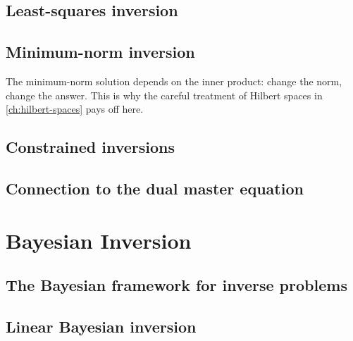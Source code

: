 \documentclass[11pt,twoside,openright]{book}
\theoremstyle{plain}
\theoremstyle{definition}
\theoremstyle{remark}
\begin{document}
\section{Least-squares inversion}
\label{sec:least-squares}

\section{Minimum-norm inversion}
\label{sec:minimum-norm}

\begin{whybox}
The minimum-norm solution depends on the inner product: change the norm,
change the answer. This is why the careful treatment of Hilbert spaces
in \cref{ch:hilbert-spaces} pays off here.
\end{whybox}

\section{Constrained inversions}
\label{sec:constrained-inversions}

\section{Connection to the dual master equation}
\label{sec:det-inv-dli}


\chapter{Bayesian Inversion}
\label{ch:bayesian-inversion}

\section{The Bayesian framework for inverse problems}
\label{sec:bayesian-framework}

\section{Linear Bayesian inversion}
\label{sec:linear-bayesian}
\end{document}
